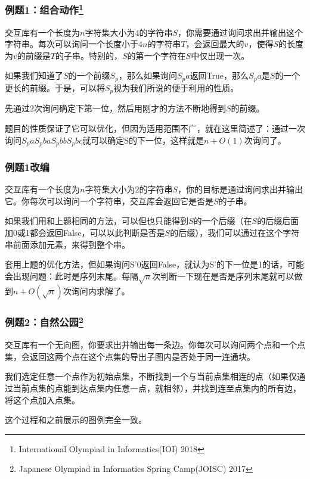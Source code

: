 \documentclass[10pt]{beamer}
\begin{document}
	\begin{frame}
		\frametitle{例题1：组合动作\footnote{International Olympiad in Informatics(IOI) 2018}}
	
		交互库有一个长度为$n$字符集大小为$4$的字符串$S$，你需要通过询问求出并输出这个字符串。每次可以询问一个长度小于$4n$的字符串$T$，会返回最大的$v$，使得$S$的长度为$v$的前缀是$T$的子串。特别的，$S$的第一个字符在$S$中仅出现一次。
	
		
		如果我们知道了$S$的一个前缀$S_p$，那么如果询问$S_pa$返回True，那么$S_pa$是$S$的一个更长的前缀。于是，可以将$S_p$视为我们所说的便于利用的性质。

		先通过$2$次询问确定下第一位，然后用刚才的方法不断地得到$S$的前缀。

		题目的性质保证了它可以优化，但因为适用范围不广，就在这里简述了：通过一次询问$S_paS_pbaS_pbbS_pbc$就可以确定S的下一位，这样就是$n+O(1)$次询问了。

	\end{frame}
	
	\begin{frame}
		\frametitle{例题1改编}

		交互库有一个长度为$n$字符集大小为$2$的字符串$S$，你的目标是通过询问求出并输出它。你每次可以询问一个字符串，交互库会返回它是否是$S$的子串。
		
		\onslide<2->
		
		如果我们用和上题相同的方法，可以但也只能得到$S$的一个后缀（在$S$的后缀后面加0或1都会返回False，可以以此判断是否是$S$的后缀），我们可以通过在这个字符串前面添加元素，来得到整个串。
		
		套用上题的优化方法，但如果询问S'0返回False，就认为S'的下一位是1的话，可能会出现问题：此时是序列末尾。每隔$\sqrt n$次判断一下现在是否是序列末尾就可以做到$n+O(\sqrt n)$次询问内求解了。
		
	\end{frame}
	
	\begin{frame}
		\frametitle{例题2：自然公园\footnote{Japanese Olympiad in Informatics Spring Camp(JOISC) 2017}}
	
		交互库有一个无向图，你要求出并输出每一条边。你每次可以询问两个点和一个点集，会返回这两个点在这个点集的导出子图内是否处于同一连通块。


		我们选定任意一个点作为初始点集，不断找到一个与当前点集相连的点（如果仅通过当前点集的点能到达点集内任意一点，就相邻），并找到连至点集内的所有边，将这个点加入点集。

		这个过程和之前展示的图例完全一致。

	\end{frame}
	
\end{document}
